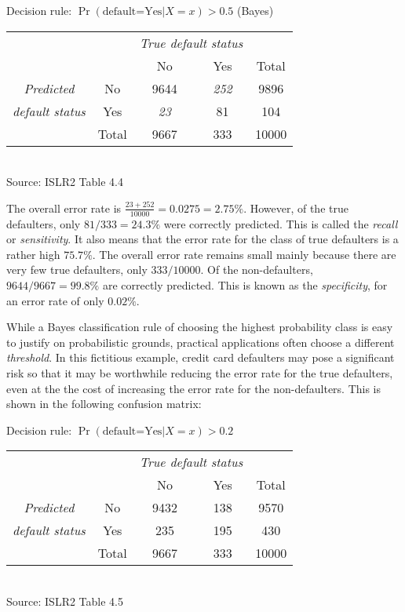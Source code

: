 \begin{center}
\renewcommand{\arraystretch}{1.25}

Decision rule: $\Pr(\text{default=Yes} | X=x) > 0.5$ (Bayes) \\ \vspace{2mm}
\begin{tabular}{cc|cc|c} \hline
     & & \multicolumn{2}{c|}{\emph{True default status}} \\
     & & No & Yes & Total \\ \hline
\emph{Predicted} & No & 9644 & \emph{252} & 9896 \\ 
\emph{default status} & Yes & \emph{23} & 81 & 104 \\ \hline
     & Total & 9667 & 333 & 10000 \\ \hline
\end{tabular} \\
\vspace{\baselineskip}
\scriptsize Source: ISLR2 Table 4.4 \normalsize \\
\end{center}

The overall error rate is $\frac{23 + 252}{10000} = 0.0275 = 2.75\%$. However, of the true defaulters, only $81/333 = 24.3\%$ were correctly predicted. This is called the \emph{recall} or \emph{sensitivity}. It also means that the error rate for the class of true defaulters is a rather high $75.7\%$. The overall error rate remains small mainly because there are very few true defaulters, only $333/10000$. Of the non-defaulters, $9644/9667=99.8\%$ are correctly predicted. This is known as the \emph{specificity}, for an error rate of only $0.02\%$.

While a Bayes classification rule of choosing the highest probability class is easy to justify on probabilistic grounds, practical applications often choose a different \emph{threshold}. In this fictitious example, credit card defaulters may pose a significant risk so that it may be worthwhile reducing the error rate for the true defaulters, even at the the cost of increasing the error rate for the non-defaulters. This is shown in the following confusion matrix:

\begin{center}
\renewcommand{\arraystretch}{1.25}

Decision rule: $\Pr(\text{default=Yes} | X=x) > 0.2$ \\ \vspace{2mm}
\begin{tabular}{cc|cc|c} \hline
     & & \multicolumn{2}{c|}{\emph{True default status}} \\
     & & No & Yes & Total \\ \hline
\emph{Predicted} & No & 9432 & 138 & 9570 \\ 
\emph{default status} & Yes & 235 & 195 & 430 \\ \hline
     & Total & 9667 & 333 & 10000 \\ \hline
\end{tabular} \\
\vspace{\baselineskip}
\scriptsize Source: ISLR2 Table 4.5 \normalsize \\
\end{center}


